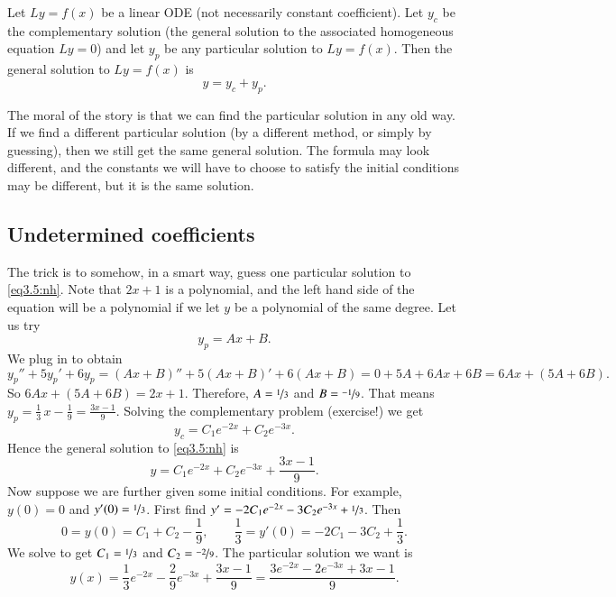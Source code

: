 \begin{theorem}
Let $Ly=f(x)$ be a linear ODE (not necessarily constant
coefficient).  Let $y_c$ be the complementary solution
(the general
solution to the associated homogeneous equation $Ly = 0$) and let $y_p$
be any particular solution to $Ly=f(x)$.  Then the general
solution to $Ly=f(x)$ is
\begin{equation*}
y = y_c + y_p.
\end{equation*}
\end{theorem}

The moral of the story is that we can find the particular solution in any old
way.  If we find a different particular solution (by a different method,
or simply by guessing),
then we still get the same general solution.
The formula may 
look different, and the constants we will have to choose to
satisfy
the initial conditions may be different, but it is the same solution.

\subsection{Undetermined coefficients}

The trick is to somehow, in a smart way, guess one particular solution to
\eqref{eq3.5:nh}.  Note that $2x+1$ is a polynomial, and the left hand 
side of the equation will be a polynomial if we let $y$ be a polynomial of
the same degree.  Let us try
\begin{equation*}
y_p = Ax + B .
\end{equation*}
We plug in to obtain
\begin{equation*}
y_p'' + 5y_p'+ 6y_p =
(Ax+B)'' + 5(Ax+B)' + 6(Ax+B) = 
0 + 5A + 6Ax + 6B = 6Ax+ (5A+6B) .
\end{equation*}
So $6Ax+(5A+6B) = 2x+1$.  Therefore, $A = \nicefrac{1}{3}$ and $B = \nicefrac{-1}{9}$.
That means
$y_p = \frac{1}{3}\, x - \frac{1}{9} = \frac{3x-1}{9}$.
Solving the complementary
problem (exercise!) we get
\begin{equation*}
y_c = C_1 e^{-2x} + C_2 e^{-3x}.
\end{equation*}
Hence the general solution to \eqref{eq3.5:nh} is
\begin{equation*}
y = C_1 e^{-2x} + C_2 e^{-3x} + \frac{3x-1}{9} .
\end{equation*}
Now suppose we are further given some initial conditions.  For example, $y(0) = 0$ and
$y'(0) = \nicefrac{1}{3}$.  First find $y' = - 2C_1 e^{-2x} - 3C_2 e^{-3x}
+ \nicefrac{1}{3}$.
Then
\begin{equation*}
0 = y(0) = C_1 + C_2 -\frac{1}{9} , \qquad
\frac{1}{3} = y'(0) = - 2C_1 - 3C_2 + \frac{1}{3} .
\end{equation*}
We solve to get $C_1 = \nicefrac{1}{3}$ and $C_2 = \nicefrac{-2}{9}$.
The particular solution we want is
\begin{equation*}
y(x) = \frac{1}{3} e^{-2x} - \frac{2}{9} e^{-3x} + \frac{3x-1}{9} =
\frac{3 e^{-2x} - 2 e^{-3x} + 3x-1}{9} .
\end{equation*}

